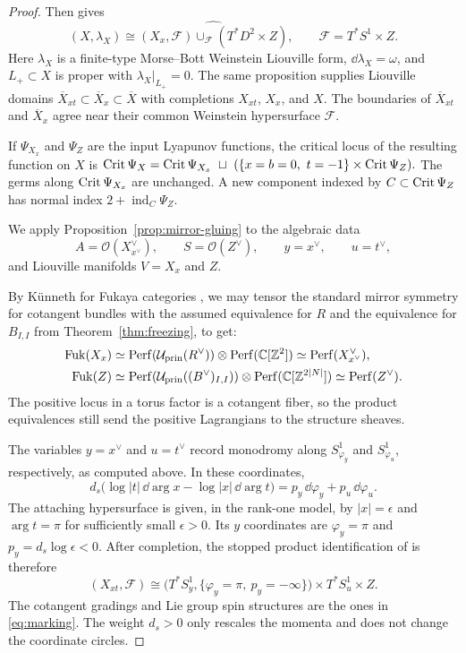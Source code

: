\documentclass[12pt, letter]{amsart}
\theoremstyle{definition}
\newcommand{\Z}{\mathbb Z}
\newcommand{\OO}{\mathcal O}
\newcommand{\pr}{\mathrm{prin}}
\numberwithin{equation}{section}
\begin{document}
\begin{proof}
Then \cite[Proposition~4.9]{HS} gives
 \begin{equation}\label{eq:handle-gluing}
 (X,\lambda_X)\cong
 \widehat{(X_x,\mathcal F)\cup_{\mathcal F}(T^*D^2\times Z)},
 \qquad \mathcal F=T^*S^1\times Z.
\end{equation}
Here $\lambda_X$ is a finite-type Morse--Bott Weinstein Liouville
form, $\dd\lambda_X=\omega$, and $L_+\subset X$ is proper with
$\lambda_X|_{L_+}=0$.
The same proposition supplies Liouville domains
$\overline X_{xt}\subset \overline X_x\subset \overline X$ with completions
$X_{xt}$, $X_x$, and $X$.
The boundaries of $\overline X_{xt}$ and $\overline X_x$ agree near their common
Weinstein hypersurface $\mathcal F$.


If $\Psi_{X_x}$ and $\Psi_Z$ are the input Lyapunov functions,
the critical locus of the resulting function on $X$ is
$
 \operatorname{Crit}\Psi_X=\operatorname{Crit}\Psi_{X_x}\ \sqcup\
(\{x=b=0,\ t=-1\}\times\operatorname{Crit}\Psi_Z).
$
The germs along $\operatorname{Crit}\Psi_{X_x}$ are unchanged.
A new component indexed by $C\subset\operatorname{Crit}\Psi_Z$ has normal
index $2+\operatorname{ind}_C\Psi_Z$.


We apply Proposition~\ref{prop:mirror-gluing} to the algebraic data
\[
 A=\OO(X^\vee_{x^\vee}),\qquad S=\OO(Z^\vee),\qquad
 y=x^\vee,\qquad u=t^\vee,
\]
and Liouville manifolds $V=X_x$ and $Z$.

By K\"unneth for Fukaya categories \cite{GPS}, we may tensor the standard mirror symmetry for cotangent bundles \cite[Theorem~1.1]{Ab} with the assumed equivalence for $R$ and the equivalence
for $B_{I,I}$ from Theorem~\ref{thm:freezing}, to get:
\[
 \begin{aligned}
 \Fuk(X_x)
 &\simeq\Perf(\cU_{\pr}(R^\vee))\otimes\Perf(\C[\Z^2])
   \simeq\Perf(X^\vee_{x^\vee}),\\
 \Fuk(Z)
 &\simeq\Perf(\cU_{\pr}((B^\vee)_{I,I}))
             \otimes\Perf(\C[\Z^{2|N|}])
   \simeq\Perf(Z^\vee).
 \end{aligned}
\]
The positive locus in
a torus factor is a cotangent fiber, so the product
equivalences still send the positive Lagrangians to the
structure sheaves.



The variables $y=x^\vee$ and $u=t^\vee$ record monodromy along
$S^1_{\varphi_y}$ and $S^1_{\varphi_u}$, respectively, as computed
above. In these coordinates,
\[
 d_s\bigl(\log|t|\,\dd\arg x-\log|x|\,\dd\arg t\bigr)
      =p_y\,\dd\varphi_y+p_u\,\dd\varphi_u.
\]
The attaching hypersurface is given, in the rank-one model, by
$|x|=\epsilon$ and $\arg t=\pi$ for sufficiently small
$\epsilon>0$. Its $y$ coordinates are
$\varphi_y=\pi$ and $p_y=d_s\log\epsilon<0$.
After completion, the stopped product identification of
\cite[Sections~4.2 and~5.3]{HS} is therefore
\[
 (X_{xt},\mathcal F)\cong
 \bigl(T^*S^1_y,\{\varphi_y=\pi,\ p_y=-\infty\}\bigr)
       \times T^*S^1_u\times Z.
\]
The cotangent gradings and Lie group spin structures are the
ones in \eqref{eq:marking}. The weight $d_s>0$ only rescales
the momenta and does not change the coordinate circles.




\end{proof}
\end{document}
